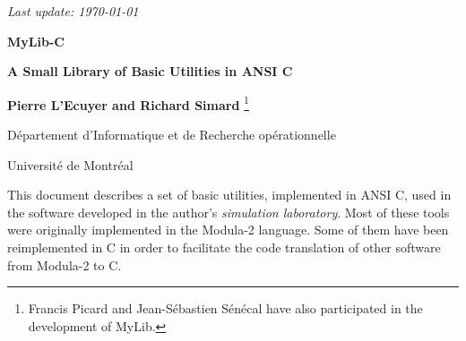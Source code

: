 \begin{titlepage}

\null 
\begin {flushright} \it Last update: \today \end {flushright}

\vfill
{ \centerline {\Large\bf MyLib-C }\bigskip\bigskip
  \centerline {\large\bf A Small Library of Basic Utilities in ANSI C }}
\vfill

\centerline {{\bf Pierre L'Ecuyer and Richard Simard} %
\footnote {Francis Picard and Jean-S\'ebastien S\'en\'ecal
           have also participated in the development of MyLib.}}
\medskip
\centerline {D\'epartement d'Informatique et de Recherche op\'erationnelle}
\centerline {Universit\'e de Montr\'eal}

\vfill
\medskip

This document describes a set of basic utilities, implemented in ANSI C,
used in the software developed in the author's {\em simulation laboratory}.
Most of these tools were originally implemented in the Modula-2 language.
Some of them have been reimplemented in C in order to facilitate
the code translation of other software from Modula-2 to C.

\vfill
\end{titlepage}

